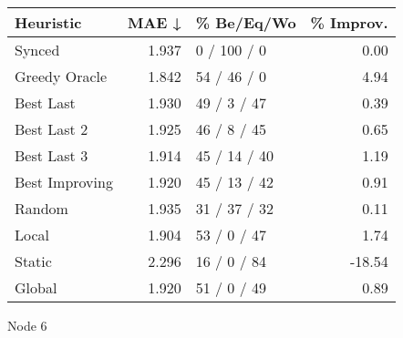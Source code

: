 \begin{tabular}{lrlr}
\toprule
\textbf{Heuristic} & \textbf{MAE ↓} & \textbf{\% Be/Eq/Wo} & \textbf{\% Improv.} \\
\midrule
            Synced &          1.937 &          0 / 100 / 0 &                0.00 \\
     Greedy Oracle &          1.842 &          54 / 46 / 0 &                4.94 \\
         Best Last &          1.930 &          49 / 3 / 47 &                0.39 \\
       Best Last 2 &          1.925 &          46 / 8 / 45 &                0.65 \\
       Best Last 3 &          1.914 &         45 / 14 / 40 &                1.19 \\
    Best Improving &          1.920 &         45 / 13 / 42 &                0.91 \\
            Random &          1.935 &         31 / 37 / 32 &                0.11 \\
             Local &          1.904 &          53 / 0 / 47 &                1.74 \\
            Static &          2.296 &          16 / 0 / 84 &              -18.54 \\
            Global &          1.920 &          51 / 0 / 49 &                0.89 \\
\bottomrule
\end{tabular}
\caption{Node 6}
\label{tab:ds_non_lr05_le2_bs4_6}
